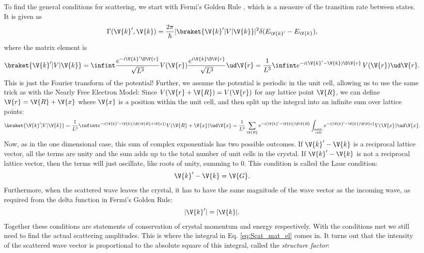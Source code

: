 \documentclass[main.tex]{subfiles}
\begin{document}
	To find the general conditions for scattering, we start with Fermi's Golden Rule \cite{simon}, which is a measure of the transition rate between states. It is given as
	\begin{equation}\label{eq:Scat_fermi}
		\Gamma(\V{k}', \V{k}) = \frac{2\pi}{\hbar}|\braket{\V{k}' | V | \V{k}}|^2 \delta(E_{\V{k}'}-E_{\V{k}}),
	\end{equation}
	where the matrix element is
	\begin{equation}\label{eq:Scat_mat_el_initial}
		\braket{\V{k}' | V | \V{k}} = \infint \frac{e^{-i \V{k}'\D\V{r}}}{\sqrt{L^3}} V(\V{r}) \frac{e^{i \V{k}\D\V{r}}}{\sqrt{L^3}} \ud \V{r} = \frac{1}{L^3} \infint e^{-i(\V{k}'-\V{k}) \D \V{r}} \, V(\V{r}) \ud \V{r}.
	\end{equation}
	This is just the Fourier transform of the potential! Further, we assume the potential is periodic in the unit cell, allowing us to use the same trick as with the Nearly Free Electron Model: Since $ V(\V{r} + \V{R}) =  V(\V{r}) $ for any lattice point $ \V{R} $, we can define $ \V{r} = \V{R} + \V{x} $ where $ \V{x} $ is a position within the unit cell, and then split up the integral into an infinite sum over lattice points:
	\begin{equation}\label{eq:Scat_mat_el}
		\braket{\V{k}' | V | \V{k}} = \frac{1}{L^3}\infint e^{-i(\V{k}'-\V{k})\D(\V{R}+\V{x})} V(\V{R}+ \V{x}) \ud \V{x} = \frac{1}{L^3} \sum_{\V{R}} e^{-i(\V{k}'-\V{k}) \D \V{R}}\int_{\substack{\text{unit-} \\\text{cell}}} e^{-i (\V{k}'-\V{k}) \D \V{x}} V(\V{x}) \ud \V{x}.
	\end{equation}
	Now, as in the one dimensional case, this sum of complex exponentials has two possible outcomes. If $ \V{k}'-\V{k} $ is a reciprocal lattice vector, all the terms are unity and the sum adds up to the total number of unit cells in the crystal. If $ \V{k}'-\V{k} $ is not a reciprocal lattice vector, then the terms will just oscillate, like roots of unity, summing to 0. This condition is called the Laue condition:
	\begin{equation}\label{eq:Scat_Laue}
		\V{k}' - \V{k} =  \V{G}.
	\end{equation}
	Furthermore, when the scattered wave leaves the crystal, it has to have the same magnitude of the wave vector as the incoming wave, as required from the delta function in Fermi's Golden Rule:
	\begin{equation}\label{eq:Scat_E_cons}
		|\V{k}'| = |\V{k}|.
	\end{equation}
	Together these conditions are statements of conservation of crystal momentum and energy respectively. With the conditions met we still need to find the actual scattering amplitudes. This is where the integral in Eq. \eqref{eq:Scat_mat_el} comes in. It turns out that the intensity of the scattered wave vector is proportional to the absolute square of this integral, called the \textit{structure factor}: \cite{simon}
\end{document}
